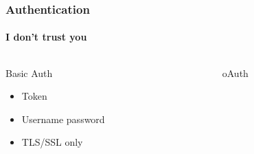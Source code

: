 \documentclass[aspectratio=169,10pt,t]{beamer}
\begin{document}
\begin{frame}[fragile]
	\frametitle{Authentication}
	\framesubtitle{I don't trust you}
	\begin{columns}
		\begin{column}{0.5\textwidth}
			Basic Auth
			\begin{itemize}
				\item Token
				\item Username password
				\item TLS/SSL only
			\end{itemize}
		\end{column}
		\begin{column}{0.5\textwidth}
			oAuth

		\end{column}
	\end{columns}
\end{frame}
\end{document}
